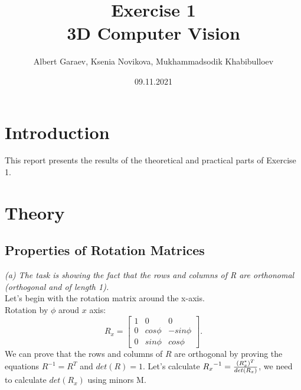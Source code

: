 \documentclass[a4paper, twoside, english]{article}
\title{Exercise 1 \\ 3D Computer Vision}  %
\author{Albert Garaev, Ksenia Novikova, Mukhammadsodik Khabibulloev }    %
\date{09.11.2021}                              %
\begin{document}
\maketitle

\section{Introduction}

This report presents the results of the theoretical and practical parts of Exercise 1.

\section{Theory}
\subsection{ Properties of Rotation Matrices}
\textit{(a) The task is showing the fact that the rows and columns of R are orthonomal\\ (orthogonal and of length 1).}\\
Let's begin with the rotation matrix around the x-axis.\\
Rotation by $\phi$ aroud $x$ axis:
\begin{equation}
	R_x = \left[
	\begin{array}{ccc}
		1 & 0 & 0 \\
		0 & cos \phi & -sin \phi \\
		0 & sin \phi & cos \phi
	\end{array}
	\right].
	\label{eq:kmatrixX}
\end{equation}
We can prove that the rows and columns of $R$ are orthogonal by proving the equations $R^{-1} = R^T$ and $det(R)=1.$
Let's calculate ${{R_x}^{-1}}={{(R_x^{*})^T}\over{det(R_x)}}$, we need to calculate $det(R_x)$ using minors M.
\end{document}
